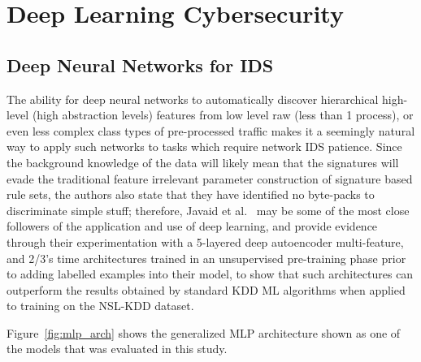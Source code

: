 \section{Deep Learning Cybersecurity}

\subsection{Deep Neural Networks for IDS}
The ability for deep neural networks to automatically discover hierarchical high-level (high abstraction levels) features from low level raw (less than 1 process), or even less complex class types of pre-processed traffic makes it a seemingly natural way to apply such networks to tasks which require network IDS patience. Since the background knowledge of the data will likely mean that the signatures will evade the traditional feature irrelevant parameter construction of signature based rule sets, the authors also state that they have identified no byte-packs to discriminate simple stuff; therefore, Javaid et al.~\cite{javaid2016deep} may be some of the most close followers of the application and use of deep learning, and provide evidence through their experimentation with a 5-layered deep autoencoder multi-feature, and 2/3's time architectures trained in an unsupervised pre-training phase prior to adding labelled examples into their model, to show that such architectures can outperform the results obtained by standard KDD ML algorithms when applied to training on the NSL-KDD dataset.

Figure~\ref{fig:mlp_arch} shows the generalized MLP architecture shown as one of the models that was evaluated in this study.

